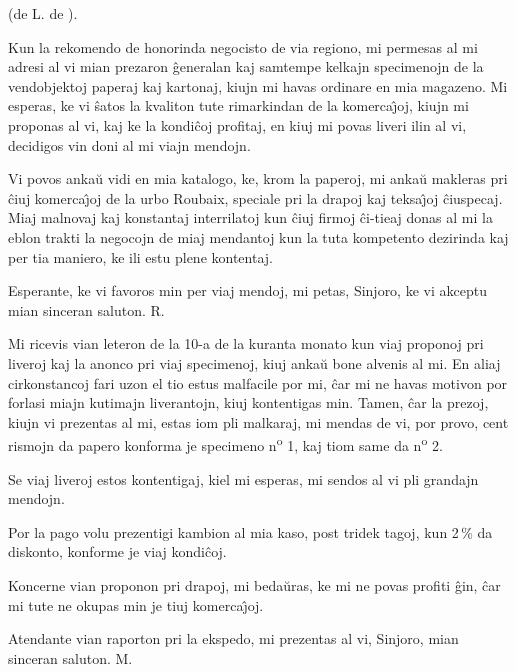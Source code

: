 \begin{center}
\footnotesize (de L. de ).
\end{center}


   Kun la rekomendo de honorinda negocisto de via regiono, mi permesas
al mi adresi al vi mian prezaron \^generalan kaj samtempe kelkajn
specimenojn de la vendobjektoj paperaj kaj kartonaj, kiujn mi havas
ordinare en mia magazeno. Mi esperas, ke vi \^satos la kvaliton tute
rimarkindan de la komerca\^{\j}oj, kiujn mi proponas al vi, kaj ke
la kondi\^coj profitaj, en kiuj mi povas liveri ilin al vi,
decidigos vin doni al mi viajn mendojn.

   Vi povos anka\u u vidi en mia katalogo, ke, krom la paperoj, mi
anka\u u makleras pri \^ciuj komerca\^{\j}oj de la urbo Roubaix,
speciale pri la drapoj kaj teksa\^{\j}oj \^ciuspecaj. Miaj malnovaj
kaj konstantaj interrilatoj kun \^ciuj firmoj \^ci-tieaj donas al mi
la eblon trakti la negocojn de miaj mendantoj kun la tuta kompetento
dezirinda kaj per tia maniero, ke ili estu plene kontentaj.

   Esperante, ke vi favoros min per viaj mendoj, mi petas, Sinjoro, ke
vi akceptu mian sinceran saluton. \hfil R.


   Mi ricevis vian leteron de la 10-a de la kuranta monato kun viaj
proponoj pri liveroj kaj la anonco pri viaj specimenoj, kiuj anka\u
u bone alvenis al mi. En aliaj cirkonstancoj fari uzon el tio estus
malfacile por mi, \^car mi ne havas motivon por forlasi miajn
kutimajn liverantojn, kiuj kontentigas min. Tamen, \^car la prezoj,
kiujn vi prezentas al mi, estas iom pli malkaraj, mi mendas de vi,
por provo, cent rismojn da papero konforma je specimeno n\textsuperscript{o} 1, kaj
tiom same da n\textsuperscript{o} 2.

   Se viaj liveroj estos kontentigaj, kiel mi esperas, mi sendos al vi
pli grandajn mendojn.

   Por la pago volu prezentigi kambion al mia kaso, post tridek tagoj,
kun 2\,\% da diskonto, konforme je viaj kondi\^coj.

   Koncerne vian proponon pri drapoj, mi beda\u uras, ke mi ne povas
profiti \^gin, \^car mi tute ne okupas min je tiuj komerca\^{\j}oj.

   Atendante vian raporton pri la ekspedo, mi prezentas al vi, Sinjoro,
mian sinceran saluton. \hfil M.

